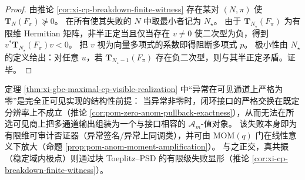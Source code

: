 \begin{proof}
由推论 \ref{cor:xi-cp-breakdown-finite-witness} 存在某对 \((N,\pi)\) 使 \(\mathbf{T}_N(F_\pi)\nsucceq 0\)。
在所有使其失败的 \(N\) 中取最小者记为 \(N_\star\)。
由于 \(\mathbf{T}_{N_\star}(F_\pi)\) 为有限维 Hermitian 矩阵，非半正定当且仅当存在 \(v\neq 0\) 使二次型为负，得到 \(v^\ast\mathbf{T}_{N_\star}(F_\pi)v<0\)。
把 \(v\) 视为向量多项式的系数即得阻断多项式 \(p\)。
极小性由 \(N_\star\) 的定义给出：对任意 \(u\)，若 \(\mathbf{T}_{N_\star-1}(F_\pi)\) 存在负二次型，则与其半正定矛盾。证毕。
\end{proof}

\begin{remark}\label{rem:xi-anom-as-cp-visible-obstruction}
定理 \ref{thm:xi-gbc-maximal-cp-visible-realization} 中“异常在可见通道上严格为零”是完全正可见实现的结构性前提：
当异常非零时，闭环接口的严格交换在既定分辨率上不成立（推论 \ref{cor:pom-zero-anom-pullback-exactness}），从而无法在所选可见商上把多通道输出组装为一个与接口相容的 \(\mathcal{A}_m\)-值对象。
该失败本身即为有限维可审计否证器（异常签名/异常上同调类），并可由 MOM\((q)\) 门在线性意义下放大（命题 \ref{prop:pom-anom-moment-amplification}）。
与之正交，真共振（稳定域内极点）则通过块 Toeplitz--PSD 的有限级失败显形（推论 \ref{cor:xi-cp-breakdown-finite-witness}）。
\end{remark}

\endinput

